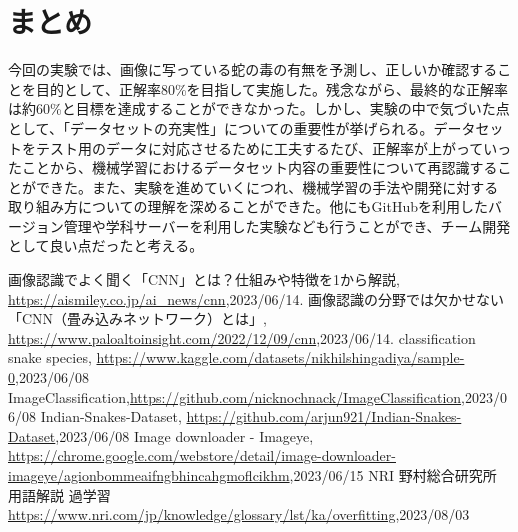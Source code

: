 \documentclass[a4paper, 11pt, titlepage]{jsarticle}
\begin{document}
\section{まとめ}
今回の実験では、画像に写っている蛇の毒の有無を予測し、正しいか確認することを目的として、正解率80\%を目指して実施した。残念ながら、最終的な正解率は約60\%と目標を達成することができなかった。しかし、実験の中で気づいた点として、「データセットの充実性」についての重要性が挙げられる。データセットをテスト用のデータに対応させるために工夫するたび、正解率が上がっていったことから、機械学習におけるデータセット内容の重要性について再認識することができた。また、実験を進めていくにつれ、機械学習の手法や開発に対する取り組み方についての理解を深めることができた。他にもGitHubを利用したバージョン管理や学科サーバーを利用した実験なども行うことができ、チーム開発として良い点だったと考える。

\begin{thebibliography}{n}
	画像認識でよく聞く「CNN」とは？仕組みや特徴を1から解説, \url{https://aismiley.co.jp/ai_news/cnn},2023/06/14.
	画像認識の分野では欠かせない「CNN（畳み込みネットワーク）とは」, \url{https://www.paloaltoinsight.com/2022/12/09/cnn},2023/06/14.
	classification snake species, \url{https://www.kaggle.com/datasets/nikhilshingadiya/sample-0},2023/06/08
	ImageClassification,\url{https://github.com/nicknochnack/ImageClassification},2023/06/08
	Indian-Snakes-Dataset, \url{https://github.com/arjun921/Indian-Snakes-Dataset},2023/06/08
	Image downloader - Imageye, \url{https://chrome.google.com/webstore/detail/image-downloader-imageye/agionbommeaifngbhincahgmoflcikhm},2023/06/15
	NRI 野村総合研究所 用語解説 過学習\url{https://www.nri.com/jp/knowledge/glossary/lst/ka/overfitting},2023/08/03
\end{thebibliography}
\end{document}
